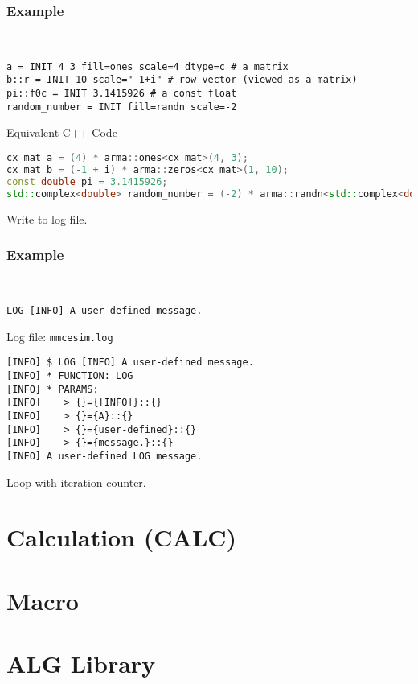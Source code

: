 \subsubsection*{Example}
\begin{example}~
  \begin{lstlisting}[language=mmcesim-sim]
a = INIT 4 3 fill=ones scale=4 dtype=c # a matrix
b::r = INIT 10 scale="-1+i" # row vector (viewed as a matrix)
pi::f0c = INIT 3.1415926 # a const float
random_number = INIT fill=randn scale=-2
  \end{lstlisting}
  Equivalent C++ Code
  \begin{lstlisting}[language=c++]
cx_mat a = (4) * arma::ones<cx_mat>(4, 3);
cx_mat b = (-1 + i) * arma::zeros<cx_mat>(1, 10);
const double pi = 3.1415926;
std::complex<double> random_number = (-2) * arma::randn<std::complex<double>>();
  \end{lstlisting}
\end{example}

Write to log file.
\subsubsection*{Example}
\begin{example}~
  \begin{lstlisting}[language=mmcesim-sim]
LOG [INFO] A user-defined message.
  \end{lstlisting}
  Log file: \texttt{mmcesim.log}
  \begin{lstlisting}[]
[INFO] $ LOG [INFO] A user-defined message.
[INFO] * FUNCTION: LOG
[INFO] * PARAMS:
[INFO]    > {}={[INFO]}::{}
[INFO]    > {}={A}::{}
[INFO]    > {}={user-defined}::{}
[INFO]    > {}={message.}::{}
[INFO] A user-defined LOG message.
  \end{lstlisting}
\end{example}

Loop with iteration counter.

\section{Calculation (CALC)}\label{d:sec:calc}

\section{Macro}

\section{ALG Library}\label{d:sec:alg_lib}
